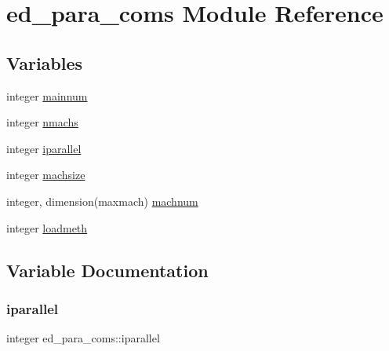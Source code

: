 \hypertarget{namespaceed__para__coms}{}\section{ed\+\_\+para\+\_\+coms Module Reference}
\label{namespaceed__para__coms}
\subsection*{Variables}
\begin{DoxyCompactItemize}
\item 
integer \hyperlink{namespaceed__para__coms_a1a6297adee3ed24d243e8acdc8a47ea9}{mainnum}
\item 
integer \hyperlink{namespaceed__para__coms_a19b6021232603bcc102754344756972d}{nmachs}
\item 
integer \hyperlink{namespaceed__para__coms_a86ef5c2ee27a88377558d7bce3256066}{iparallel}
\item 
integer \hyperlink{namespaceed__para__coms_ac54b6ab59f73c004e11f26ed942382c6}{machsize}
\item 
integer, dimension(maxmach) \hyperlink{namespaceed__para__coms_a38ed61f526634d9930f8f93a6a65cba4}{machnum}
\item 
integer \hyperlink{namespaceed__para__coms_a3ad2033c27d55eca30c6ce0e80c50274}{loadmeth}
\end{DoxyCompactItemize}


\subsection{Variable Documentation}
\mbox{\label{namespaceed__para__coms_a86ef5c2ee27a88377558d7bce3256066}} 
\subsubsection{\texorpdfstring{iparallel}{iparallel}}
{\footnotesize\ttfamily integer ed\+\_\+para\+\_\+coms\+::iparallel}

\mbox{\label{namespaceed__para__coms_a3ad2033c27d55eca30c6ce0e80c50274}} 
